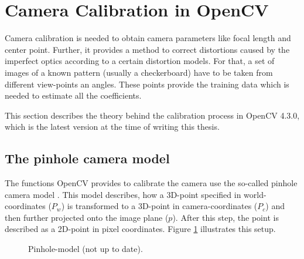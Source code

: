 \section{Camera Calibration in OpenCV}
Camera calibration is needed to obtain camera parameters like focal length and center point.
Further, it provides a method to correct distortions caused by the imperfect optics according to a certain distortion models.
For that, a set of images of a known pattern (usually a checkerboard) have to be taken from different view-points an angles.
These points provide the training data which is needed to estimate all the coefficients.

This section describes the theory behind the calibration process in OpenCV 4.3.0, which is the latest version at the time of writing this thesis.
\subsection{The pinhole camera model}
The functions OpenCV provides to calibrate the camera use the so-called pinhole camera model \cite{cv_calib}.
This model describes, how a 3D-point specified in world-coordinates ($P_w$) is transformed to a 3D-point in camera-coordinates ($P_c$) and then further projected onto the image plane ($p$). After this step, the point is described as a 2D-point in pixel coordinates.  Figure \ref{theory:pin} illustrates this setup.
\begin{figure}[ht]
	\centering
	\caption{Pinhole-model (not up to date).\label{theory:pin}}
\end{figure} 

